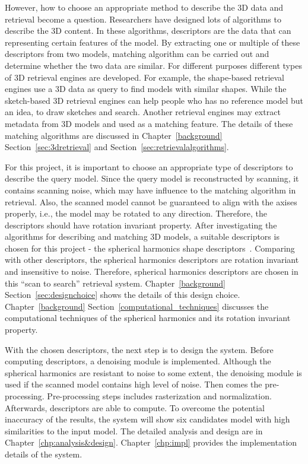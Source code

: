However, how to choose an appropriate method to describe the 3D data and retrieval become a question. Researchers have designed lots of algorithms to describe the 3D content. In these algorithms, descriptors are the data that can representing certain features of the model. By extracting one or multiple of these descriptors from two models, matching algorithm can be carried out and determine whether the two data are similar. For different purposes different types of 3D retrieval engines are developed. For example, the shape-based retrieval engines use a 3D data as query to find models with similar shapes. While the sketch-based 3D retrieval engines can help people who has no reference model but an idea, to draw sketches and search. Another retrieval engines may extract metadata from 3D models and used as a matching feature. The details of these matching algorithms are discussed in Chapter~\ref{background} Section~\ref{sec:3dretrieval} and Section~\ref{sec:retrievalalgorithms}. 

For this project, it is important to choose an appropriate type of descriptors to describe the query model. Since the query model is reconstructed by scanning, it contains scanning noise, which may have influence to the matching algorithm in retrieval. Also, the scanned model cannot be guaranteed to align with the axises properly, i.e., the model may be rotated to any direction. Therefore, the descriptors should have rotation invariant property. After investigating the algorithms for describing and matching 3D models, a suitable descriptors is chosen for this project - the spherical harmonics shape descriptors~\cite{kazhdan2003rotation}. Comparing with other descriptors, the spherical harmonics descriptors are rotation invariant and insensitive to noise. Therefore, spherical harmonics descriptors are chosen in this ``scan to search'' retrieval system. Chapter~\ref{background} Section~\ref{sec:designchoice} shows the details of this design choice. Chapter~\ref{background} Section~\ref{computational_techniques} discusses the computational techniques of the spherical harmonics and its rotation invariant property. 

With the chosen descriptors, the next step is to design the system. Before computing descriptors, a denoising module is implemented. Although the spherical harmonics are resistant to noise to some extent, the denoising module is used if the scanned model contains high level of noise. Then comes the pre-processing. Pre-processing steps includes rasterization and normalization. Afterwards, descriptors are able to compute. To overcome the potential inaccuracy of the results, the system will show six candidates model with high similarities to the input model. The detailed analysis and design are in Chapter~\ref{chp:analysis&design}. Chapter~\ref{chp:impl} provides the implementation details of the system. 

